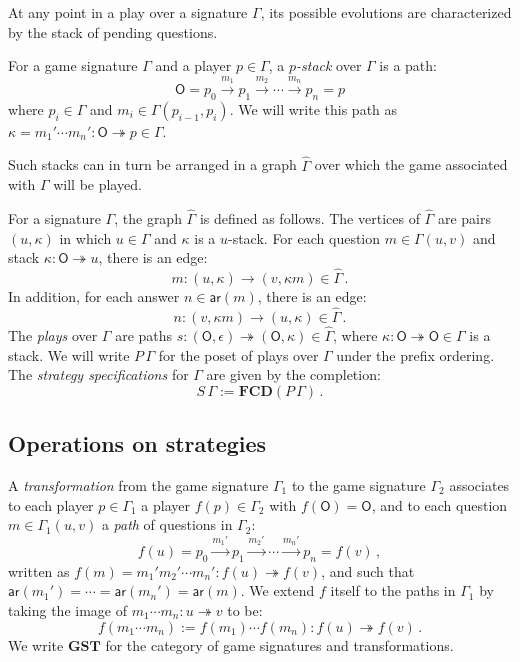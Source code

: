 \documentclass[sigplan,screen]{acmart}
\newcommand{\kw}[1]{\ensuremath{ \mathsf{#1} }}
\begin{document}
At any point in a play over a signature $\Gamma$,
its possible evolutions
are characterized by the stack of pending questions.

\begin{definition}
For a game signature $\Gamma$ and a player $p \in \Gamma$,
a \emph{$p$-stack} over $\Gamma$ is a path:
\[
  \kw{O} = p_0 \xrightarrow{m_1} p_1 \xrightarrow{m_2} \cdots
             \xrightarrow{m_n} p_n = p
\]
where $p_i \in \Gamma$ and $m_i \in \Gamma(p_{i-1}, p_i)$.
We will write this path as
$\kappa = m_1' \cdots m_n' : \kw{O} \twoheadrightarrow p 
 \in \Gamma$.
\end{definition}

Such stacks can in turn be arranged in a graph $\hat{\Gamma}$
over which the game associated with $\Gamma$ will be played.

\begin{definition} %
For a signature $\Gamma$,
the graph $\hat{\Gamma}$ is defined as follows.
The vertices of $\hat{\Gamma}$ are pairs $(u, \kappa)$
in which $u \in \Gamma$ and $\kappa$ is a $u$-stack.
For each question $m \in \Gamma(u,v)$
and stack $\kappa : \kw{O} \twoheadrightarrow u$,
there is an edge:
\[
    m : (u, \kappa) \rightarrow (v, \kappa m) \in \hat{\Gamma} \,.
\]
In addition, for each answer $n \in \kw{ar}(m)$,
there is an edge:
\[
    n : (v, \kappa m) \rightarrow (u, \kappa) \in \hat{\Gamma} \,.
\]
The \emph{plays} over $\Gamma$
are paths
$s : (\kw{O}, \epsilon) \twoheadrightarrow (\kw{O}, \kappa)
 \in \hat{\Gamma}$,
where $\kappa : \kw{O} \twoheadrightarrow \kw{O} \in \Gamma$
is a stack.
We will write
$P \, \Gamma$
for the poset of plays over $\Gamma$
under the prefix ordering.
The \emph{strategy specifications} for $\Gamma$
are given by the completion:
\[
    S \, \Gamma := \mathbf{FCD}(P \, \Gamma) \,.
\]
\end{definition}


\subsection{Operations on strategies} %

\begin{definition}
A \emph{transformation}
from the game signature $\Gamma_1$
to the game signature $\Gamma_2$
associates to each player $p \in \Gamma_1$ a player $f(p) \in \Gamma_2$
with $f(\kw{O}) = \kw{O}$,
and to each question $m \in \Gamma_1(u,v)$
a \emph{path} of questions in $\Gamma_2$:
\[
  f(u) = p_0 \xrightarrow{m_1'} p_1 \xrightarrow{m_2'} \cdots
             \xrightarrow{m_n'} p_n = f(v) \,,
\]
written as
$f(m) = m_1' m_2' \cdots m_n' : f(u) \twoheadrightarrow f(v)$, and
such that
$\kw{ar}(m_1') = \cdots = \kw{ar}(m_n') = \kw{ar}(m)$.
We extend $f$ itself to the paths in $\Gamma_1$
by taking the image of $m_1 \cdots m_n : u \twoheadrightarrow v$
to be:
\[
  f(m_1 \cdots m_n) := f(m_1) \cdots f(m_n) :
    f(u) \twoheadrightarrow f(v) \,.
\]
We write $\mathbf{GST}$ for the category of
game signatures and transformations.
\end{definition}
\end{document}
